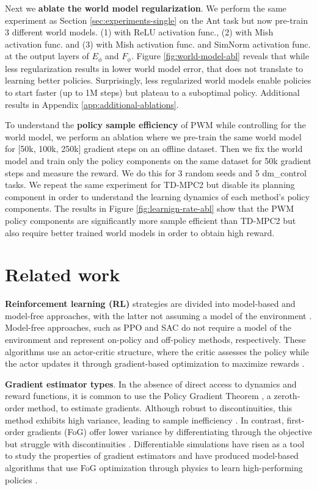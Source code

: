 \documentclass{article} %
\begin{document}
Next we \textbf{ablate the world model regularization}. We perform the same experiment as Section \ref{sec:experiments-single} on the Ant task but now pre-train 3 different world models. (1) with ReLU activation func., (2) with Mish activation func. and (3) with Mish activation func. and SimNorm activation func. at the output layers of $E_\phi$ and $F_\phi$. Figure \ref{fig:world-model-abl} reveals that while less regularization results in lower world model error, that does not translate to learning better policies. Surprisingly, less regularized world models enable policies to start faster (up to 1M steps) but plateau to a suboptimal policy. Additional results in Appendix \ref{app:additional-ablations}.

To understand the \textbf{policy sample efficiency} of PWM while controlling for the world model, we perform an ablation where we pre-train the same world model for [50k, 100k, 250k] gradient steps on an offline dataset. Then we fix the world model and train only the policy components on the same dataset for 50k gradient steps and measure the reward. We do this for 3 random seeds and 5 dm\_control tasks. We repeat the same experiment for TD-MPC2 but disable its planning component in order to understand the learning dynamics of each method's policy components. The results in Figure \ref{fig:learnign-rate-abl} show that the PWM policy components are significantly more sample efficient than TD-MPC2 but also require better trained world models in order to obtain high reward.

\section{Related work}

\textbf{Reinforcement learning (RL)} strategies are divided into model-based and model-free approaches, with the latter not assuming a model of the environment \citet{arulkumaran2017deep}. Model-free approaches, such as PPO \citet{schulman2017proximal} and SAC \citet{haarnoja2018soft} do not require a model of the environment and represent on-policy and off-policy methods, respectively. These algorithms use an actor-critic structure, where the critic assesses the policy while the actor updates it through gradient-based optimization to maximize rewards \citet{konda1999actor}.

\textbf{Gradient estimator types}. In the absence of direct access to dynamics and reward functions, it is common to use the Policy Gradient Theorem \citet{sutton1999policy}, a zeroth-order method, to estimate gradients. Although robust to discontinuities, this method exhibits high variance, leading to sample inefficiency \citet{mohamed2020monte}. In contrast, first-order gradients (FoG) offer lower variance by differentiating through the objective but struggle with discontinuities \citet{suh2022differentiable}. Differentiable simulations have risen as a tool to study the properties of gradient estimators \citet{howell2022dojo,metz2021gradients} and have produced model-based algorithms that use FoG optimization through physics to learn high-performing policies \citet{xu2022accelerated,georgiev2024adaptive}.
\end{document}
